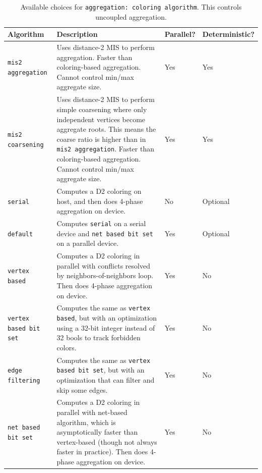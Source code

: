 \begin{table}[H]
  \begin{center}
    \begin{tabular}{p{4.0cm} p{8.5cm} p{1.5cm} p{2.0cm}}
      Algorithm & Description & Parallel? & Deterministic? \\
      \toprule
      \verb!mis2 aggregation! &     Uses distance-2 MIS to perform aggregation.
                                    Faster than coloring-based aggregation.
                                    Cannot control min/max aggregate size. & Yes & Yes \\
      \verb!mis2 coarsening! &      Uses distance-2 MIS to perform simple coarsening where only independent vertices become aggregate roots.
                                    This means the coarse ratio is higher than in \verb!mis2 aggregation!.
                                    Faster than coloring-based aggregation.  Cannot control min/max aggregate size. & Yes & Yes \\
      \verb!serial! &               Computes a D2 coloring on host, and then does 4-phase aggregation on device. & No & Optional \\
      \verb!default! &              Computes \verb!serial! on a serial device and \verb!net based bit set! on a parallel device. & Yes & Optional \\
      \verb!vertex based! &         Computes a D2 coloring in parallel with conflicts resolved by neighbors-of-neighbors loop. Then does 4-phase aggregation on device. & Yes & No \\
      \verb!vertex based bit set! & Computes the same as \verb!vertex based!, but with an optimization using a 32-bit integer instead of 32 bools to track forbidden colors. & Yes & No \\
      \verb!edge filtering! &       Computes the same as \verb!vertex based bit set!, but with an optimization that can filter and skip some edges. & Yes & No \\
      \verb!net based bit set! &    Computes a D2 coloring in parallel with net-based algorithm, which is asymptotically faster than vertex-based (though not always faster in practice).
                                    Then does 4-phase aggregation on device. & Yes & No \\
      \bottomrule
    \end{tabular}
    \caption{Available choices for \texttt{aggregation: coloring algorithm}. This controls uncoupled aggregation. }
\label{t:coloring_algs}
  \end{center}
\end{table}

